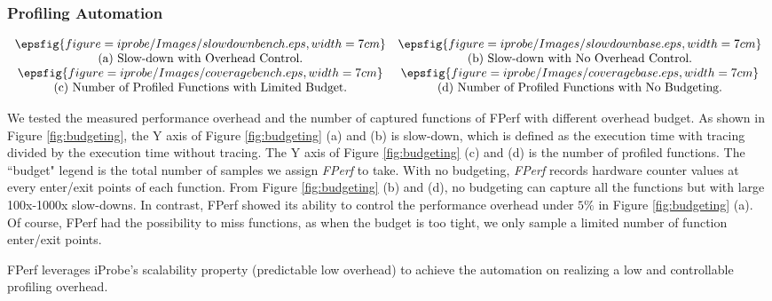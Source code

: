 \subsubsection{Profiling Automation}

\begin{figure*}[!ht]
    \begin{center}
     $\begin{array} {cc}        
        \epsfig{figure=iprobe/Images/slowdownbench.eps,width=7cm} & \epsfig{figure=iprobe/Images/slowdownbase.eps,width=7cm}\\
        \mbox{(a) Slow-down with Overhead Control.} & \mbox{(b) Slow-down with No Overhead Control.}\\
        \epsfig{figure=iprobe/Images/coveragebench.eps,width=7cm} & \epsfig{figure=iprobe/Images/coveragebase.eps,width=7cm}\\
        \mbox{(c) Number of Profiled Functions with Limited Budget.} & \mbox{(d) Number of Profiled Functions with No Budgeting.}\\
        \end{array}$
    \end{center}
    \caption{Overhead Control and Number of Captured Functions Comparison.}
    \label{fig:budgeting}
\end{figure*} 

We tested the measured performance overhead and the number of captured functions of FPerf with different overhead budget. %
As shown in Figure \ref{fig:budgeting}, the Y axis of Figure \ref{fig:budgeting} (a) and (b) is slow-down, which is defined as the execution time with tracing divided by the execution time without tracing. 
The Y axis of Figure \ref{fig:budgeting} (c) and (d) is the number of profiled functions. The ``budget" legend is the total number of samples we assign \textit{FPerf} to take. 
With no budgeting, \textit{FPerf} records hardware counter values at every enter/exit points of each function. 
From Figure \ref{fig:budgeting} (b) and (d), no budgeting can capture all the functions but with large 100x-1000x slow-downs. 
In contrast, FPerf showed its ability to control the performance overhead under $5\%$ in Figure \ref{fig:budgeting} (a).
Of course, FPerf had the possibility to miss functions, as when the budget is too tight, we only sample a limited number of function enter/exit points.

FPerf leverages iProbe's scalability property (predictable low overhead) to achieve the automation on realizing a low and controllable profiling overhead.





